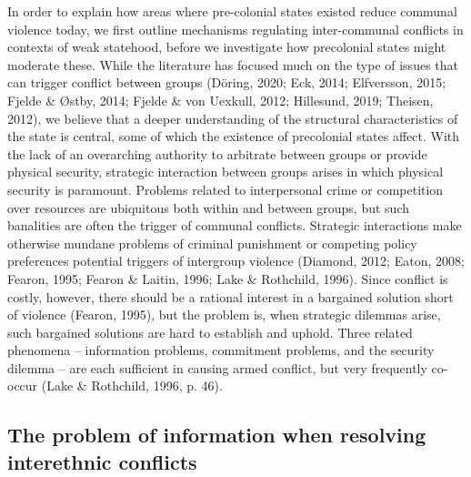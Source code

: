 \documentclass[12pt]{article}
\begin{document}
In order to explain how areas where pre-colonial states existed reduce communal
violence today, we first outline mechanisms regulating inter-communal conflicts
in contexts of weak statehood, before we investigate how precolonial states
might moderate these. While the literature has focused much on the type of
issues that can trigger conflict between groups (Döring, 2020; Eck, 2014;
Elfversson, 2015; Fjelde \& Østby, 2014; Fjelde \& von Uexkull, 2012; Hillesund,
2019; Theisen, 2012), we believe that a deeper understanding of the structural
characteristics of the state is central, some of which the existence of
precolonial states affect. With the lack of an overarching authority to
arbitrate between groups or provide physical security, strategic interaction
between groups arises in which physical security is paramount. Problems related
to interpersonal crime or competition over resources are ubiquitous both within
and between groups, but such banalities are often the trigger of communal
conflicts. Strategic interactions make otherwise mundane problems of criminal
punishment or competing policy preferences potential triggers of intergroup
violence (Diamond, 2012; Eaton, 2008; Fearon, 1995; Fearon \& Laitin, 1996; Lake
							  \& Rothchild, 1996).
Since conflict is costly, however, there should be a rational interest in a
bargained solution short of violence (Fearon, 1995), but the problem is, when
strategic dilemmas arise, such bargained solutions are hard to establish and
uphold. Three related phenomena – information problems, commitment problems, and
the security dilemma – are each sufficient in causing armed conflict, but very
frequently co-occur (Lake \& Rothchild, 1996, p. 46).

\subsection{The problem of information when resolving interethnic conflicts}
\end{document}
